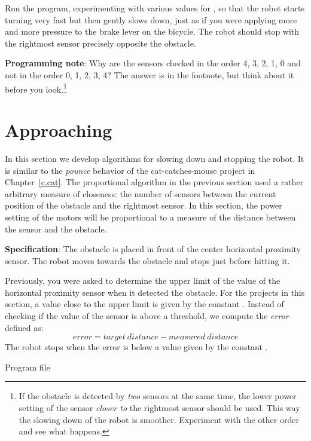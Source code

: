 Run the program, experimenting with various values for ,
so that the robot starts turning very fast but then gently
slows down, just as if you were applying more and more pressure to the
brake lever on the bicycle. The robot should stop with the rightmost
sensor precisely opposite the obstacle.

\textbf{Programming note}: Why are the sensors checked in the order 4,
3, 2, 1, 0 and not in the order 0, 1, 2, 3, 4? The answer is in the
footnote, but think about it before you look.\footnote{If the obstacle
is detected by \emph{two} sensors at the same time, the lower power
setting of the sensor \emph{closer to} the rightmost sensor should be
used. This way the slowing down of the robot is smoother. Experiment
with the other order and see what happens.}


\section{Approaching}

In this section we develop algorithms for slowing down and stopping the
robot. It is similar to the \emph{pounce} behavior of the
cat-catches-mouse project in Chapter~\ref{c.cat}. The proportional
algorithm in the previous section used a rather arbitrary measure of
closeness: the number of sensors between the current position of the
obstacle and the rightmost sensor. In this section, the power setting of
the motors will be proportional to a measure of the distance between the
sensor and the obstacle.

\textbf{Specification}: The obstacle is placed in front of the center
horizontal proximity sensor. The robot moves towards the obstacle and
stops just before hitting it.

Previously, you were asked to determine the upper limit of the value of
the horizontal proximity sensor when it detected the obstacle. For the
projects in this section, a value close to the upper limit is
given by the constant . Instead of checking if the value of
the sensor is above a threshold, we compute the \emph{error} defined as:
\begin{displaymath}
\mathit{error} = \mathit{target\ distance} - \mathit{measured\ distance} 
\end{displaymath}
The robot stops when the error is below a value given by the constant
.


{\raggedleft \hfill Program file }

